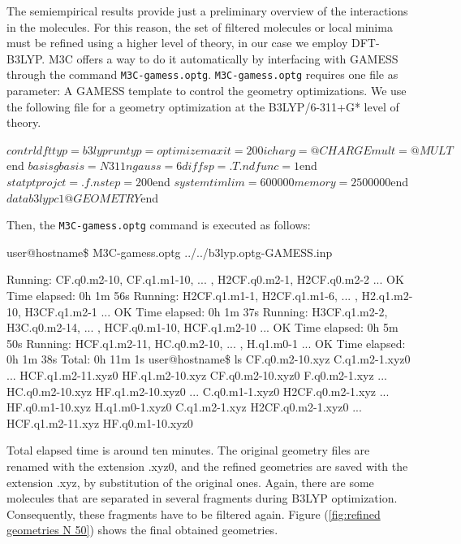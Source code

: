 \documentclass[a4paper,12pt]{article}
\begin{document}
The semiempirical results provide just a preliminary overview of the interactions in the molecules. For this reason,
the set of filtered molecules or local minima must be refined using a higher level of theory, in our case we employ DFT-B3LYP.
M3C offers a way to do it automatically by interfacing with GAMESS through the command \texttt{M3C-gamess.optg}.
\texttt{M3C-gamess.optg} requires one file as parameter: A GAMESS template to control the geometry optimizations. We use 
the following file for a geometry optimization at the B3LYP/6-311+G* level of theory.

\begin{bifile}[caption=\footnotesize GAMESS template for geometry optimization at B3LYP level (b3lyp.optg-GAMESS.inp)]
 $contrl dfttyp=b3lyp runtyp=optimize
  maxit=200 icharg=@CHARGE mult=@MULT $end
 $basis gbasis=N311 ngauss=6 diffsp=.T. ndfunc=1 $end
 $statpt projct=.f. nstep=200 $end
 $system timlim=600000 memory=2500000 $end
 $data
 b3lyp
 c1
 @GEOMETRY
 $end
\end{bifile}
Then, the \texttt{M3C-gamess.optg} command is executed as follows:
\begin{shellexec}
user@hostname\$ M3C-gamess.optg ../../b3lyp.optg-GAMESS.inp

Running:   CF.q0.m2-10,  CF.q1.m1-10,  ... , H2CF.q0.m2-1, H2CF.q0.m2-2 ... OK   Time elapsed: 0h  1m 56s
Running:  H2CF.q1.m1-1, H2CF.q1.m1-6,  ... ,  H2.q1.m2-10, H3CF.q1.m2-1 ... OK   Time elapsed: 0h  1m 37s
Running:  H3CF.q1.m2-2, H3C.q0.m2-14,  ... , HCF.q0.m1-10, HCF.q1.m2-10 ... OK   Time elapsed: 0h  5m 50s
Running:  HCF.q1.m2-11,  HC.q0.m2-10,  ... ,    H.q1.m0-1               ... OK   Time elapsed: 0h  1m 38s
                                                                                        Total: 0h 11m  1s
user@hostname\$ ls
CF.q0.m2-10.xyz   C.q1.m2-1.xyz0     ...    HCF.q1.m2-11.xyz0  HF.q1.m2-10.xyz
CF.q0.m2-10.xyz0  F.q0.m2-1.xyz      ...    HC.q0.m2-10.xyz    HF.q1.m2-10.xyz0
...
C.q0.m1-1.xyz0    H2CF.q0.m2-1.xyz   ...    HF.q0.m1-10.xyz    H.q1.m0-1.xyz0
C.q1.m2-1.xyz     H2CF.q0.m2-1.xyz0  ...    HCF.q1.m2-11.xyz   HF.q0.m1-10.xyz0
\end{shellexec}
Total elapsed time is around ten minutes. The original geometry files are renamed with the extension .xyz0, and the 
refined geometries are saved with the extension .xyz, by substitution of the original ones. Again, there are some 
molecules that are separated in several fragments during B3LYP optimization.
Consequently, these fragments have to be filtered again. 
Figure (\ref{fig:refined geometries N 50}) shows the final obtained geometries.
\end{document}
